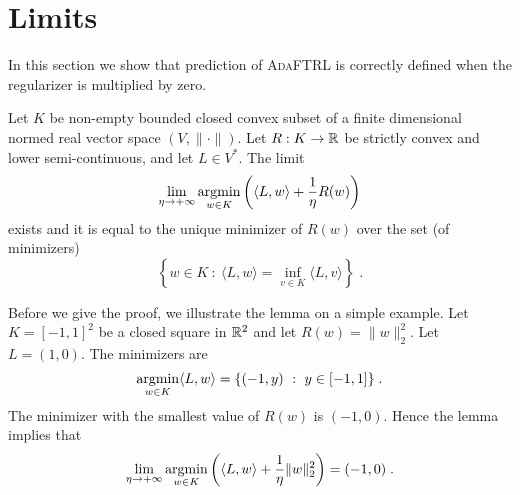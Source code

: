 \section{Limits}
\label{section:limits}

In this section we show that prediction of \textsc{AdaFTRL} is correctly
defined when the regularizer is multiplied by zero.

\begin{lemma}
\label{lemma:prediction-limit-existence}
Let $K$ be non-empty bounded closed convex subset of a finite dimensional
normed real vector space $(V, \|\cdot\|)$.  Let $R:K \to \mathbb{R}$ be strictly convex
and lower semi-continuous, and let $L \in V^*$. The limit
\begin{equation}
\label{equation:limit}
\lim_{\eta \to +\infty}
\operatorname*{argmin}_{w \in K} \left( \langle L, w \rangle + \frac{1}{\eta} R(w) \right)
\end{equation}
exists and it is equal to the unique minimizer of $R(w)$ over the set (of minimizers)
$$
\left\{ w \in K ~:~ \langle L, w \rangle = \inf_{v \in K} \langle L, v \rangle \right\} \; .
$$
\end{lemma}

Before we give the proof, we illustrate the lemma on a simple
example.  Let $K = [-1,1]^2$ be a closed square in $\mathbb{R}^2$ and let
$R(w) = \|w\|_2^2$. Let $L = (1,0)$. The minimizers are
$$
\operatorname*{argmin}_{w \in K} \langle L, w \rangle = \{ (-1,y) ~:~ y \in [-1,1] \} \; .
$$
The minimizer with the smallest value of $R(w)$ is $(-1,0)$. Hence the lemma
implies that
$$
\lim_{\eta \to +\infty} \operatorname*{argmin}_{w \in K}
\left( \langle L, w \rangle + \frac{1}{\eta} \|w\|_2^2 \right) = (-1, 0) \; .
$$

